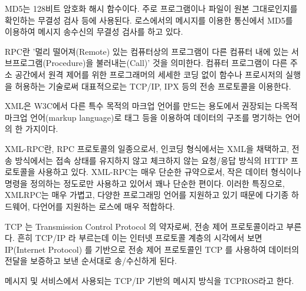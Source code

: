 \begin{definition}\label{def:RosMD5}
MD5는 128비트 암호화 해시 함수이다. 주로 프로그램이나 파일이 원본 그대로인지를 확인하는 무결성 검사 등에 사용된다. 로스에서의 메시지를 이용한 통신에서 MD5를 이용하여 메시지 송수신의 무결성 검사를 하고 있다.
\end{definition}

\begin{definition}\label{def:RosRPC}
RPC란 '멀리 떨어져(Remote) 있는 컴퓨터상의 프로그램이 다른 컴퓨터 내에 있는 서브프로그램(Procedure)을 불러내는(Call)' 것을 의미한다. 컴퓨터 프로그램이 다른 주소 공간에서 원격 제어를 위한 프로그래머의 세세한 코딩 없이 함수나 프로시저의 실행을 허용하는 기술로써 대표적으로는 TCP/IP, IPX 등의 전송 프로토콜을 이용한다. 
\end{definition}

\begin{definition}\label{def:RosXML}
XML은 W3C에서 다른 특수 목적의 마크업 언어를 만드는 용도에서 권장되는 다목적 마크업 언어(markup language)로 태그 등을 이용하여 데이터의 구조를 명기하는 언어의 한 가지이다. 
\end{definition}

\begin{definition}[XMLRPC]\label{def:RosXMLRPC}
XML-RPC란, RPC 프로토콜의 일종으로서, 인코딩 형식에서는 XML을 채택하고, 전송 방식에서는 접속 상태를 유지하지 않고 체크하지 않는 요청/응답 방식의 HTTP 프로토콜을 사용하고 있다. XML-RPC는 매우 단순한 규약으로서, 작은 데이터 형식이나 명령을 정의하는 정도로만 사용하고 있어서 꽤나 단순한 편이다. 이러한 특징으로, XMLRPC는 매우 가볍고, 다양한 프로그래밍 언어를 지원하고 있기 때문에 다기종 하드웨어, 다언어를 지원하는 로스에 매우 적합하다.
\end{definition}

\begin{definition}\label{def:RosTCPIP}
TCP 는 Transmission Control Protocol 의 약자로써, 전송 제어 프로토콜이라고 부른다. 흔히 TCP/IP 라 부르는데 이는 인터넷 프로토콜 계층의 시각에서 보면 IP(Internet Protocol) 를 기반으로 전송 제어 프로토콜인 TCP 를 사용하여 데이터의 전달을 보증하고 보낸 순서대로 송/수신하게 된다. 
\end{definition}

\begin{definition}[TCPROS]\label{def:RosTCPROS}
메시지 및 서비스에서 사용되는 TCP/IP 기반의 메시지 방식을 TCPROS라고 한다.
\end{definition}

